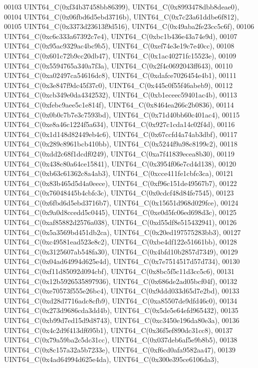 \begin{DoxyCode}
00103     UINT64\_C(0xf34b37458bb86399), UINT64\_C(0x8993478dbb8deae0),
00104     UINT64\_C(0x06fbd6d5ebd3716b), UINT64\_C(0x7c23a61ddbe6f812),
00105     UINT64\_C(0x3373d23613f9d516), UINT64\_C(0x49aba2fe23cc5c6f),
00106     UINT64\_C(0xc6c333a67392c7e4), UINT64\_C(0xbc1b436e43a74e9d),
00107     UINT64\_C(0x95ac9329ac4bc9b5), UINT64\_C(0xef74e3e19c7e40cc),
00108     UINT64\_C(0x601c72b9cc20db47), UINT64\_C(0x1ac40271fc15523e),
00109     UINT64\_C(0x5594765a340a7f3a), UINT64\_C(0x2f4c0692043ff643),
00110     UINT64\_C(0xa02497ca54616dc8), UINT64\_C(0xdafce7026454e4b1),
00111     UINT64\_C(0x3e847f9dc45f37c0), UINT64\_C(0x445c0f55f46abeb9),
00112     UINT64\_C(0xcb349e0da4342532), UINT64\_C(0xb1eceec59401ac4b),
00113     UINT64\_C(0xfebc9aee5c1e814f), UINT64\_C(0x8464ea266c2b0836),
00114     UINT64\_C(0x0b0c7b7e3c7593bd), UINT64\_C(0x71d40bb60c401ac4),
00115     UINT64\_C(0xe8a46c1224f5a634), UINT64\_C(0x927c1cda14c02f4d),
00116     UINT64\_C(0x1d148d82449eb4c6), UINT64\_C(0x67ccfd4a74ab3dbf),
00117     UINT64\_C(0x289c8961bcb410bb), UINT64\_C(0x5244f9a98c8199c2),
00118     UINT64\_C(0xdd2c68f1dcdf0249), UINT64\_C(0xa7f41839ecea8b30),
00119     UINT64\_C(0x438c80a64ce15841), UINT64\_C(0x3954f06e7cd4d138),
00120     UINT64\_C(0xb63c61362c8a4ab3), UINT64\_C(0xcce411fe1cbfc3ca),
00121     UINT64\_C(0x83b465d5d4a0eece), UINT64\_C(0xf96c151de49567b7),
00122     UINT64\_C(0x76048445b4cbfc3c), UINT64\_C(0x0cdcf48d84fe7545),
00123     UINT64\_C(0x6fbd6d5ebd3716b7), UINT64\_C(0x15651d968d029fce),
00124     UINT64\_C(0x9a0d8ccedd5c0445), UINT64\_C(0xe0d5fc06ed698d3c),
00125     UINT64\_C(0xaf85882d2576a038), UINT64\_C(0xd55df8e515432941),
00126     UINT64\_C(0x5a3569bd451db2ca), UINT64\_C(0x20ed197575283bb3),
00127     UINT64\_C(0xc49581ead523e8c2), UINT64\_C(0xbe4df122e51661bb),
00128     UINT64\_C(0x3125607ab548fa30), UINT64\_C(0x4bfd10b2857d7349),
00129     UINT64\_C(0x04ad64994d625e4d), UINT64\_C(0x7e7514517d57d734),
00130     UINT64\_C(0xf11d85092d094cbf), UINT64\_C(0x8bc5f5c11d3cc5c6),
00131     UINT64\_C(0x12b5926535897936), UINT64\_C(0x686de2ad05bcf04f),
00132     UINT64\_C(0xe70573f555e26bc4), UINT64\_C(0x9ddd033d65d7e2bd),
00133     UINT64\_C(0xd28d7716adc8cfb9), UINT64\_C(0xa85507de9dfd46c0),
00134     UINT64\_C(0x273d9686cda3dd4b), UINT64\_C(0x5de5e64efd965432),
00135     UINT64\_C(0xb99d7ed15d9d8743), UINT64\_C(0xc3450e196da80e3a),
00136     UINT64\_C(0x4c2d9f413df695b1), UINT64\_C(0x36f5ef890dc31cc8),
00137     UINT64\_C(0x79a59ba2c5dc31cc), UINT64\_C(0x037deb6af5e9b8b5),
00138     UINT64\_C(0x8c157a32a5b7233e), UINT64\_C(0xf6cd0afa9582aa47),
00139     UINT64\_C(0x4ad64994d625e4da), UINT64\_C(0x300e395ce6106da3),

\end{DoxyCode}
